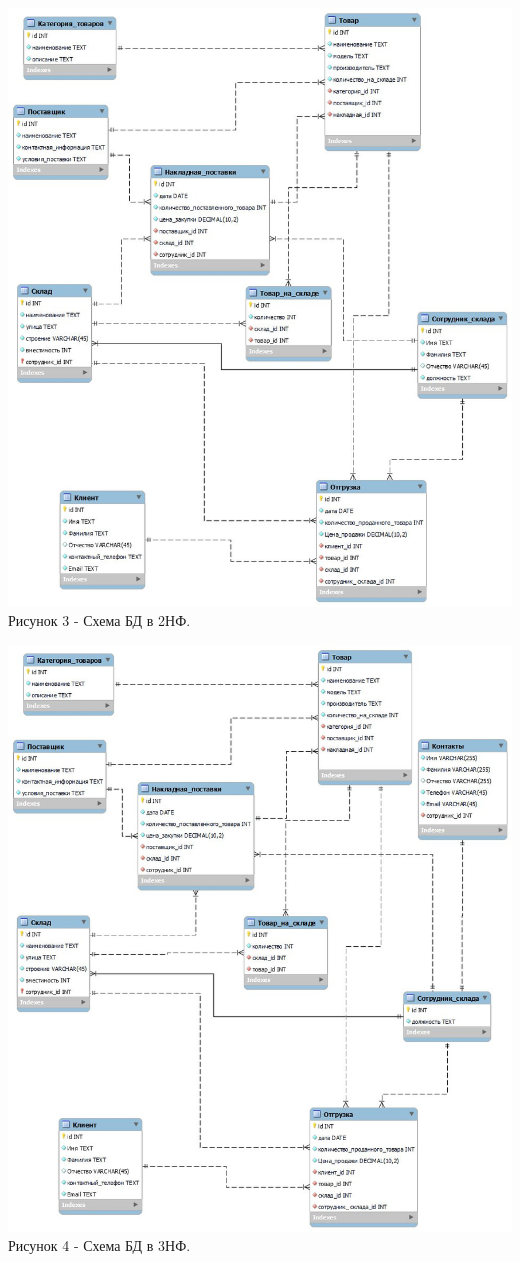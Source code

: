\documentclass[14pt]{extreport}
\begin{document}
\begin{center}
    \centering 
    \includegraphics[width=1.0\linewidth]{second.jpg}
    \\Рисунок 3 - Схема БД в 2НФ.
\end{center}

\begin{center}
    \centering 
    \includegraphics[width=1.0\linewidth]{third.jpg}
    \\Рисунок 4 - Схема БД в 3НФ.
\end{center}
\newpage
\end{document}
